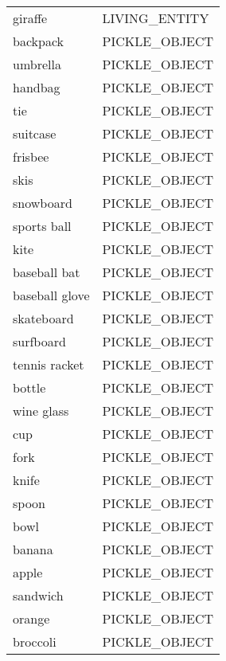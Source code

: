 \begin{supertabular}{|l|l|}
  giraffe               & \tiny{LIVING\_ENTITY    } \\
  backpack              & \tiny{PICKLE\_OBJECT    } \\
  umbrella              & \tiny{PICKLE\_OBJECT    } \\
  handbag               & \tiny{PICKLE\_OBJECT    } \\
  tie                   & \tiny{PICKLE\_OBJECT    } \\
  suitcase              & \tiny{PICKLE\_OBJECT    } \\
  frisbee               & \tiny{PICKLE\_OBJECT    } \\
  skis                  & \tiny{PICKLE\_OBJECT    } \\
  snowboard             & \tiny{PICKLE\_OBJECT    } \\
  sports ball           & \tiny{PICKLE\_OBJECT    } \\
  kite                  & \tiny{PICKLE\_OBJECT    } \\
  baseball bat          & \tiny{PICKLE\_OBJECT    } \\
  baseball glove        & \tiny{PICKLE\_OBJECT    } \\
  skateboard            & \tiny{PICKLE\_OBJECT    } \\
  surfboard             & \tiny{PICKLE\_OBJECT    } \\
  tennis racket         & \tiny{PICKLE\_OBJECT    } \\
  bottle                & \tiny{PICKLE\_OBJECT    } \\
  wine glass            & \tiny{PICKLE\_OBJECT    } \\
  cup                   & \tiny{PICKLE\_OBJECT    } \\
  fork                  & \tiny{PICKLE\_OBJECT    } \\
  knife                 & \tiny{PICKLE\_OBJECT    } \\
  spoon                 & \tiny{PICKLE\_OBJECT    } \\
  bowl                  & \tiny{PICKLE\_OBJECT    } \\
  banana                & \tiny{PICKLE\_OBJECT    } \\
  apple                 & \tiny{PICKLE\_OBJECT    } \\
  sandwich              & \tiny{PICKLE\_OBJECT    } \\
  orange                & \tiny{PICKLE\_OBJECT    } \\
  broccoli              & \tiny{PICKLE\_OBJECT    } \\

\end{supertabular}
